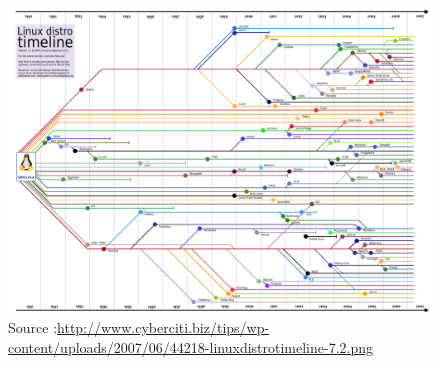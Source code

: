 \documentclass[11pt]{article} %
\begin{document}
        \begin{figure}
   \centering
\includegraphics[scale=0.2]{linuxdistrotimeline.png}
\caption{{\tiny Source :\url{http://www.cyberciti.biz/tips/wp-content/uploads/2007/06/44218-linuxdistrotimeline-7.2.png}}}
      \end{figure}




\newpage

\newpage 
\tableofcontents
\newpage
\end{document}
